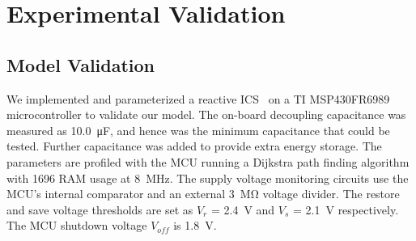 
\section{Experimental Validation} \label{sec:c3_experiment}

\subsection{Model Validation} 

We implemented and parameterized a reactive ICS~\cite{balsamo2015hibernus} on a TI MSP430FR6989 microcontroller to validate our model. The on-board decoupling capacitance was measured as \SI{10.0}{\micro\farad}, and hence was the minimum capacitance that could be tested. Further capacitance was added to provide extra energy storage. The parameters are profiled with the MCU running a Dijkstra path finding algorithm with \SI{1696}{\byte} RAM usage at \SI{8}{\mega\hertz}. The supply voltage monitoring circuits use the MCU's internal comparator and an external \SI{3}{\mega\ohm} voltage divider. The restore and save voltage thresholds are set as $V_{r}$ = \SI{2.4}{\volt} and $V_{s}$ = \SI{2.1}{\volt} respectively. The MCU shutdown voltage $V_{off}$ is \SI{1.8}{\volt}. 


